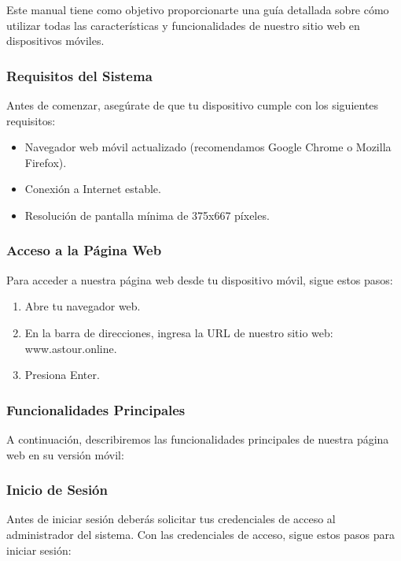 Este manual tiene como objetivo proporcionarte una guía detallada sobre cómo utilizar todas las características y funcionalidades de nuestro sitio web en dispositivos móviles.

\subsubsection{Requisitos del Sistema}
Antes de comenzar, asegúrate de que tu dispositivo cumple con los siguientes requisitos:

\begin{itemize}
	\item Navegador web móvil actualizado (recomendamos Google Chrome o Mozilla Firefox).
	\item Conexión a Internet estable.
	\item Resolución de pantalla mínima de 375x667 píxeles.
\end{itemize}

\subsubsection{Acceso a la Página Web}
Para acceder a nuestra página web desde tu dispositivo móvil, sigue estos pasos:

\begin{enumerate}
	\item Abre tu navegador web.
	\item En la barra de direcciones, ingresa la URL de nuestro sitio web: www.astour.online.
	\item Presiona Enter.
\end{enumerate}

\subsubsection{Funcionalidades Principales}
A continuación, describiremos las funcionalidades principales de nuestra página web en su versión móvil:

\subsubsection{Inicio de Sesión}
Antes de iniciar sesión deberás solicitar tus credenciales de acceso al administrador del sistema.
Con las credenciales de acceso, sigue estos pasos para iniciar sesión:

